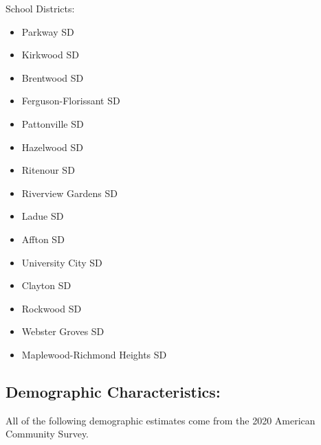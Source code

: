   \noindent School Districts:
    \begin{multicols}{2}
    \begin{itemize}
      \item Parkway SD
      \item Kirkwood SD
      \item Brentwood SD
      \item Ferguson-Florissant SD
      \item Pattonville SD
      \item Hazelwood SD
      \item Ritenour SD
      \item Riverview Gardens SD
      \item Ladue SD
      \item Affton SD
      \item University City SD
      \item Clayton SD
      \item Rockwood SD
      \item Webster Groves SD
      \item Maplewood-Richmond Heights SD
    \end{itemize}
    \end{multicols}
    


    \subsection{Demographic Characteristics:}

    All of the following demographic estimates come from the 2020 American Community Survey.

